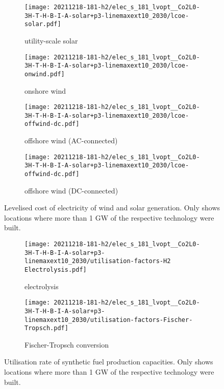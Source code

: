 \begin{figure}
    \begin{subfigure}{0.49\textwidth}
        \centering
        \caption{utility-scale solar}
        \texttt{[image: 20211218-181-h2/elec\_s\_181\_lvopt\_\_Co2L0-3H-T-H-B-I-A-solar+p3-linemaxext10\_2030/lcoe-solar.pdf]}
    \end{subfigure}
    \begin{subfigure}{0.49\textwidth}
        \centering
        \caption{onshore wind}
        \texttt{[image: 20211218-181-h2/elec\_s\_181\_lvopt\_\_Co2L0-3H-T-H-B-I-A-solar+p3-linemaxext10\_2030/lcoe-onwind.pdf]}
    \end{subfigure}
    \begin{subfigure}{0.49\textwidth}
        \centering
        \caption{offshore wind (AC-connected)}
        \texttt{[image: 20211218-181-h2/elec\_s\_181\_lvopt\_\_Co2L0-3H-T-H-B-I-A-solar+p3-linemaxext10\_2030/lcoe-offwind-dc.pdf]}
    \end{subfigure}
    \begin{subfigure}{0.49\textwidth}
        \centering
        \caption{offshore wind (DC-connected)}
        \texttt{[image: 20211218-181-h2/elec\_s\_181\_lvopt\_\_Co2L0-3H-T-H-B-I-A-solar+p3-linemaxext10\_2030/lcoe-offwind-dc.pdf]}
    \end{subfigure}
    \caption{Levelised cost of electricity of wind and solar generation. Only shows locations where more than 1 GW of the respective technology were built.}
    \label{fig:si:lcoe}
\end{figure}

\begin{figure}
    \centering
    \begin{subfigure}{0.66\textwidth}
        \centering
        \caption{electrolysis}
        \texttt{[image: 20211218-181-h2/elec\_s\_181\_lvopt\_\_Co2L0-3H-T-H-B-I-A-solar+p3-linemaxext10\_2030/utilisation-factors-H2 Electrolysis.pdf]}
    \end{subfigure}
    \begin{subfigure}{0.66\textwidth}
        \centering
        \caption{Fischer-Tropsch conversion}
        \texttt{[image: 20211218-181-h2/elec\_s\_181\_lvopt\_\_Co2L0-3H-T-H-B-I-A-solar+p3-linemaxext10\_2030/utilisation-factors-Fischer-Tropsch.pdf]}
    \end{subfigure}
    \caption{Utilisation rate of synthetic fuel production capacities. Only shows locations where more than 1 GW of the respective technology were built.}
    \label{fig:si:utilisation-rate-map}
\end{figure}

